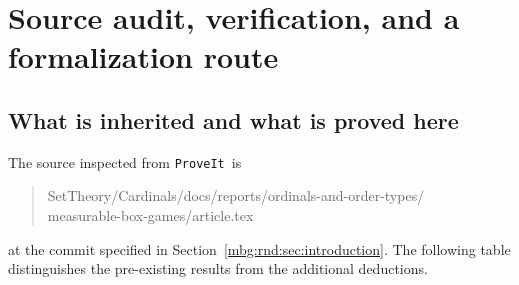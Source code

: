 \documentclass[11pt,letterpaper]{article}
\theoremstyle{definition}
\newcommand{\repo}{\texttt{ProveIt}}
\begin{document}
\section{Source audit, verification, and a formalization route}
\label{mbg:rnd:sec:provenance}

\subsection{What is inherited and what is proved here}

The source inspected from \repo\ is
\begin{quote}\small\ttfamily
SetTheory/Cardinals/docs/reports/ordinals-and-order-types/\\
measurable-box-games/article.tex
\end{quote}
at the commit specified in Section~\ref{mbg:rnd:sec:introduction}. The following table
distinguishes the pre-existing results from the additional deductions.
\end{document}
